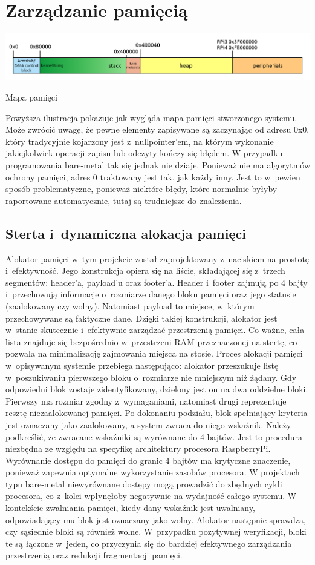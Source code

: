\documentclass[shortabstract]{iithesis}
\begin{document}
\section{Zarządzanie pamięcią}
\begingroup
\centering
\includegraphics[width=\textwidth]{memorymap.png}
\captionsetup{type=figure}
\caption{Mapa pamięci}
\endgroup
Powyższa ilustracja pokazuje jak wygląda mapa pamięci stworzonego systemu. Może zwrócić uwagę, że pewne elementy zapisywane są zaczynając od adresu 0x0, który tradycyjnie kojarzony jest z~nullpointer'em, na którym wykonanie jakiejkolwiek operacji zapisu lub odczyty kończy się błędem. W przypadku programowania bare-metal tak się jednak nie dziaje. Ponieważ nie ma algorytmów ochrony pamięci, adres 0 traktowany jest tak, jak każdy inny. Jest to w~pewien sposób problematyczne, ponieważ niektóre błędy, które normalnie byłyby raportowane automatycznie, tutaj są trudniejsze do znalezienia.
\subsection{Sterta i~dynamiczna alokacja pamięci}
Alokator pamięci w~tym projekcie został zaprojektowany z~naciskiem na prostotę i~efektywność. Jego konstrukcja opiera się na liście, składającej się z~trzech segmentów: header'a, payload'u oraz footer'a. Header i~footer zajmują po 4 bajty i~przechowują informacje o~rozmiarze danego bloku pamięci oraz jego statusie (zaalokowany czy wolny). Natomiast payload to miejsce, w~którym przechowywane są faktyczne dane. Dzięki takiej konstrukcji, alokator jest w~stanie skutecznie i~efektywnie zarządzać przestrzenią pamięci. Co ważne, cała lista znajduje się bezpośrednio w~przestrzeni RAM przeznaczonej na stertę, co pozwala na minimalizację zajmowania miejsca na stosie. 
Proces alokacji pamięci w~opisywanym systemie przebiega następująco: alokator przeszukuje listę w~poszukiwaniu pierwszego bloku o~rozmiarze nie mniejszym niż żądany. Gdy odpowiedni blok zostaje zidentyfikowany, dzielony jest on na dwa oddzielne bloki. Pierwszy ma rozmiar zgodny z~wymaganiami, natomiast drugi reprezentuje resztę niezaalokowanej pamięci. Po dokonaniu podziału, blok spełniający kryteria jest oznaczany jako zaalokowany, a system zwraca do niego wskaźnik.
Należy podkreślić, że zwracane wskaźniki są wyrównane do 4 bajtów. Jest to procedura niezbędna ze względu na specyfikę architektury procesora RaspberryPi. Wyrównanie dostępu do pamięci do granic 4 bajtów ma krytyczne znaczenie, ponieważ zapewnia optymalne wykorzystanie zasobów procesora. W projektach typu bare-metal niewyrównane dostępy mogą prowadzić do zbędnych cykli procesora, co z~kolei wpłynęłoby negatywnie na wydajność całego systemu.
W kontekście zwalniania pamięci, kiedy dany wskaźnik jest uwalniany, odpowiadający mu blok jest oznaczany jako wolny. Alokator następnie sprawdza, czy sąsiednie bloki są również wolne. W~przypadku pozytywnej weryfikacji, bloki te są łączone w~jeden, co przyczynia się do bardziej efektywnego zarządzania przestrzenią oraz redukcji fragmentacji pamięci.
\end{document}
